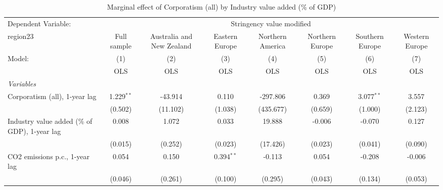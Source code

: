 
\begin{table}[htbp]
   \caption{Marginal effect of Corporatism (all) by Industry value added (\% of GDP)}
   \centering
   \begin{tabular}{lccccccc}
      \toprule
      Dependent Variable: & \multicolumn{7}{c}{Stringency value modified}\\
      region23                                                                      & Full sample   & Australia and New Zealand & Eastern Europe & Northern America & Northern Europe & Southern Europe & Western Europe \\   
      Model:                                                                        & (1)           & (2)                       & (3)            & (4)              & (5)             & (6)             & (7)\\  
                                                                                    &  OLS          & OLS                       & OLS            & OLS              & OLS             & OLS             & OLS\\  
      \midrule
      \emph{Variables}\\
      Corporatism (all), 1-year lag                                                 & 1.229$^{**}$  & -43.914                   & 0.110          & -297.806         & 0.369           & 3.077$^{**}$    & 3.557\\   
                                                                                    & (0.502)       & (11.102)                  & (1.038)        & (435.677)        & (0.659)         & (1.000)         & (2.123)\\   
      Industry value added (\% of GDP), 1-year lag                                  & 0.008         & 1.072                     & 0.033          & 19.888           & -0.006          & -0.070          & 0.127\\   
                                                                                    & (0.015)       & (0.252)                   & (0.023)        & (17.426)         & (0.023)         & (0.041)         & (0.090)\\   
      CO2 emissions p.c., 1-year lag                                                & 0.054         & 0.150                     & 0.394$^{**}$   & -0.113           & 0.054           & -0.208          & -0.006\\   
                                                                                    & (0.046)       & (0.261)                   & (0.100)        & (0.295)          & (0.043)         & (0.134)         & (0.053)\\   

\end{tabular}
\end{table}
